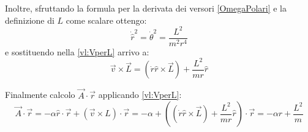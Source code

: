\documentclass[../main.tex]{subfiles}
\begin{document}
Inoltre, sfruttando la formula per la derivata dei versori \cref{OmegaPolari} e la definizione di $L$ come scalare ottengo:
\begin{equation*}
	\dot{\hat r}^2=\dot{\theta}^2=\frac{L^2}{m^2r^4}
\end{equation*}
e sostituendo nella \cref{vl:VperL} arrivo a:
\begin{equation}\label{vl:fineConto}
	\vec v\times \vec L=(\dot r \hat r \times \vec L)+\frac{L^2}{mr}\hat r
\end{equation}

Finalmente calcolo $\vec A\cdot \vec r$ applicando \cref{vl:VperL}:
\begin{equation*}
	\vec A\cdot \vec r=-\alpha\hat r\cdot \vec r+(\vec v\times L)\cdot \vec r=
	-\alpha+\left((\dot r \hat r \times \vec L)+\frac{L^2}{mr}\hat r\right)\cdot \vec r=
	-\alpha r+\frac{L^2}{m}
\end{equation*}
\end{document}
